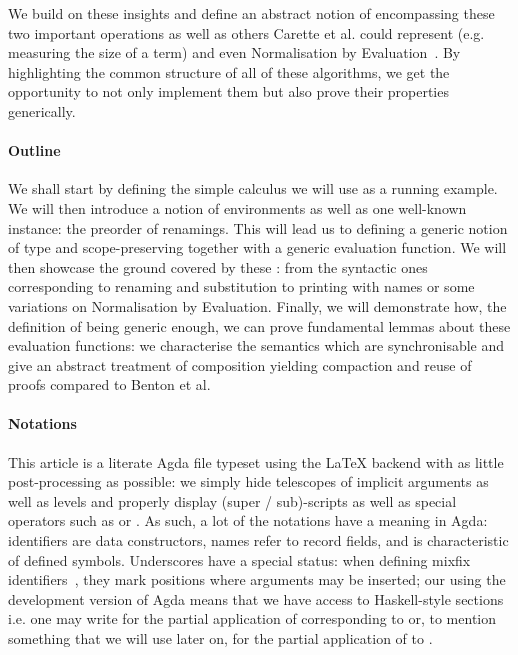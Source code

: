 We build on these insights and define an abstract notion of 
encompassing these two important operations as well as others Carette et al.
could represent (e.g. measuring the size of a term) and even Normalisation
by Evaluation~\cite{berger1991inverse}. By highlighting the common structure
of all of these algorithms, we get the opportunity to not only implement
them but also prove their properties generically.

\paragraph{Outline} We shall start by defining the simple calculus we will use
as a running example. We will then introduce a notion of environments as well
as one well-known instance: the preorder of renamings. This will lead
us to defining a generic notion of type and scope-preserving 
together with a generic evaluation function. We will then showcase the
ground covered by these : from the syntactic ones corresponding
to renaming and substitution to printing with names or some variations on Normalisation
by Evaluation. Finally, we will demonstrate how, the definition of 
being generic enough, we can prove fundamental lemmas about these evaluation
functions: we characterise the semantics which are synchronisable and give an
abstract treatment of composition yielding compaction and reuse of proofs
compared to Benton et al.~\cite{benton2012strongly}

\paragraph{Notations} This article is a literate Agda file typeset using the
\LaTeX{} backend with as little post-processing as possible: we simply hide
telescopes of implicit arguments as well as  levels and properly display (super / sub)-scripts
as well as special operators such as \AF{>>=} or \AF{++}. As such, a lot of
the notations have a meaning in Agda:  identifiers are data constructors,
 names refer to record fields, and  is characteristic of
defined symbols. Underscores have a special status: when defining mixfix
identifiers~\cite{danielsson2011parsing}, they mark positions where arguments
may be inserted; our using the development version of Agda means that we have
access to Haskell-style sections i.e. one may write \AF{\_+}  for the partial
application of \AF{\_+\_} corresponding to     \AF{+} 
or, to mention something that we will use later on,  
for the partial application of  to .

